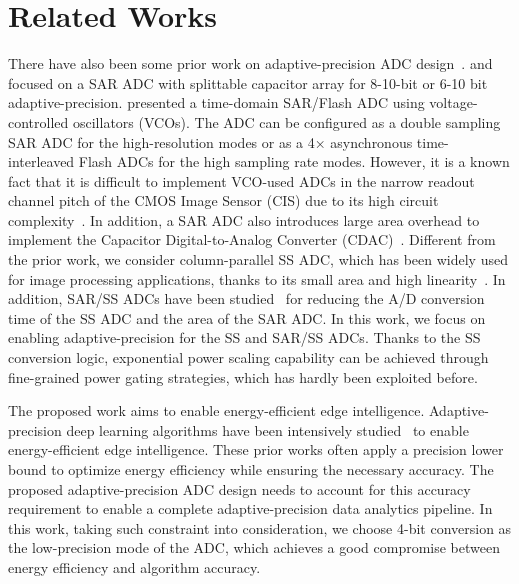 \section{Related Works}\label{related}

There have also been some prior work on adaptive-precision ADC design~\cite{zhu_06_2013,zhu_6--10-bit_2015,el-halwagy_100-mss5-gss_2018}. 
\cite{zhu_06_2013} and \cite{zhu_6--10-bit_2015} focused on a SAR ADC with splittable capacitor array for 8-10-bit or 6-10 bit adaptive-precision. 
\cite{el-halwagy_100-mss5-gss_2018} presented a time-domain SAR/Flash ADC using voltage-controlled oscillators (VCOs). The ADC can be configured as a double sampling SAR ADC for the high-resolution modes or as a 4× asynchronous time-interleaved Flash ADCs for the high sampling rate modes.
However, it is a known fact that it is difficult to implement VCO-used ADCs in the narrow readout channel pitch of the CMOS Image Sensor (CIS) due to its high circuit complexity~\cite{kim_area-efficient_2016}. In addition, a SAR ADC also introduces large area overhead to implement the Capacitor Digital-to-Analog Converter (CDAC)~\cite{funatsu_62_2015}.
Different from the prior work, we consider column-parallel SS ADC, which has been widely used for image processing applications, 
thanks to its small area and high linearity~\cite{kim_11-bit_2021,nie_single_2020,kumagai_14-inch_2018,park_640_2020}. 
In addition, SAR/SS ADCs have been studied~\cite{kim_area-efficient_2016,chen_12_2014} for reducing the A/D conversion time of 
the SS ADC and the area of the SAR ADC.     
In this work, we focus on enabling adaptive-precision for the SS and SAR/SS ADCs. Thanks to the SS conversion logic, exponential power 
scaling capability can be achieved through fine-grained power gating strategies, which has hardly been exploited before.


The proposed work aims to enable energy-efficient edge intelligence.  Adaptive-precision deep learning algorithms have been intensively studied~\cite{leibe_xnor-net_2016,li_ternary_2016,park_energy-efficient_2018} to enable energy-efficient edge intelligence. These prior works often apply a precision lower bound to optimize energy efficiency while ensuring the necessary accuracy.  The proposed adaptive-precision ADC design needs to account for this accuracy requirement to enable a complete adaptive-precision data analytics pipeline.  In this work, taking such constraint into consideration, we choose 4-bit conversion as the low-precision mode of the ADC, which achieves a good compromise between energy efficiency and algorithm accuracy. 

